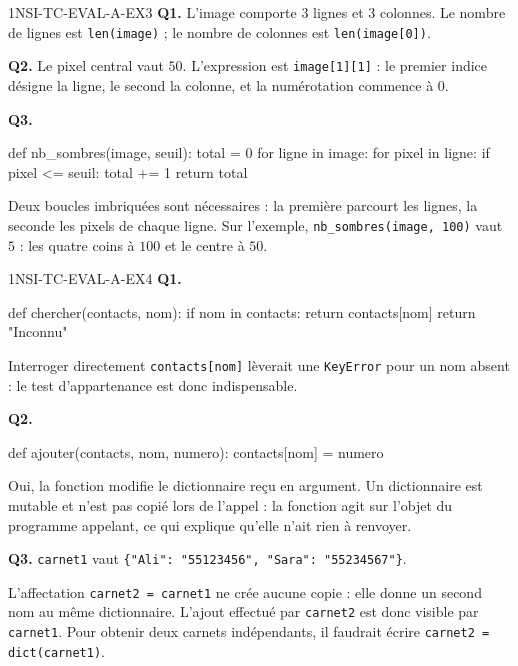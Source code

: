 \begin{corrige}{1NSI-TC-EVAL-A-EX3}
\textbf{Q1.} L'image comporte $3$ lignes et $3$ colonnes. Le nombre de lignes est \lstinline{len(image)} ; le nombre de colonnes est \lstinline{len(image[0])}.

\textbf{Q2.} Le pixel central vaut $50$. L'expression est \lstinline{image[1][1]} : le premier indice désigne la ligne, le second la colonne, et la numérotation commence à $0$.

\textbf{Q3.}
\begin{python}
def nb_sombres(image, seuil):
    total = 0
    for ligne in image:
        for pixel in ligne:
            if pixel <= seuil:
                total += 1
    return total
\end{python}
Deux boucles imbriquées sont nécessaires : la première parcourt les lignes, la seconde les pixels de chaque ligne. Sur l'exemple, \lstinline{nb_sombres(image, 100)} vaut $5$ : les quatre coins à $100$ et le centre à $50$.
\end{corrige}

\begin{corrige}{1NSI-TC-EVAL-A-EX4}
\textbf{Q1.}
\begin{python}
def chercher(contacts, nom):
    if nom in contacts:
        return contacts[nom]
    return "Inconnu"
\end{python}
Interroger directement \lstinline{contacts[nom]} lèverait une \lstinline{KeyError} pour un nom absent : le test d'appartenance est donc indispensable.

\textbf{Q2.}
\begin{python}
def ajouter(contacts, nom, numero):
    contacts[nom] = numero
\end{python}
Oui, la fonction modifie le dictionnaire reçu en argument. Un dictionnaire est mutable et n'est pas copié lors de l'appel : la fonction agit sur l'objet du programme appelant, ce qui explique qu'elle n'ait rien à renvoyer.

\textbf{Q3.} \lstinline{carnet1} vaut \lstinline|{"Ali": "55123456", "Sara": "55234567"}|.

L'affectation \lstinline{carnet2 = carnet1} ne crée aucune copie : elle donne un second nom au même dictionnaire. L'ajout effectué par \lstinline{carnet2} est donc visible par \lstinline{carnet1}. Pour obtenir deux carnets indépendants, il faudrait écrire \lstinline{carnet2 = dict(carnet1)}.
\end{corrige}
